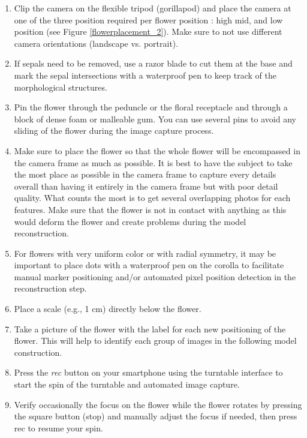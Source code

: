 \documentclass[10pt,letter,english]{article}
\begin{document}
\begin{enumerate}
    \item Clip the camera on the flexible tripod (gorillapod) and place the camera at one of the three position required per flower position : high mid, and low position (see Figure \ref{flowerplacement_2}). Make sure to not use different camera orientations (landscape vs. portrait).
    \item If sepals need to be removed, use a razor blade to cut them at the base and mark the sepal intersections with a waterproof pen to keep track of the morphological structures.
    \item Pin the flower through the peduncle or the floral receptacle and through a block of dense foam or malleable gum. You can use several pins to avoid any sliding of the flower during the image capture process.
    \item Make sure to place the flower so that the whole flower will be encompassed in the camera frame as much as possible. It is best to have the subject to take the most place as possible in the camera frame to capture every details overall than having it entirely in the camera frame but with poor detail quality. What counts the most is to get several overlapping photos for each features. Make sure that the flower is not in contact with anything as this would deform the flower and create problems during the model reconstruction.
    \item For flowers with very uniform color or with radial symmetry, it may be important to place dots with a waterproof pen on the corolla to facilitate manual marker positioning and/or automated pixel position detection in the reconstruction step.
    \item Place a scale (e.g., 1 cm) directly below the flower.
    \item Take a picture of the flower with the label for each new positioning of the flower. This will help to identify each group of images in the following model construction.
    \item Press the \textit{rec} button on your smartphone using the turntable interface to start the spin of the turntable and automated image capture.
    \item Verify occasionally the focus on the flower while the flower rotates by pressing the square button (stop) and manually adjust the focus if needed, then press rec to resume your spin.
\end{enumerate}
\end{document}
